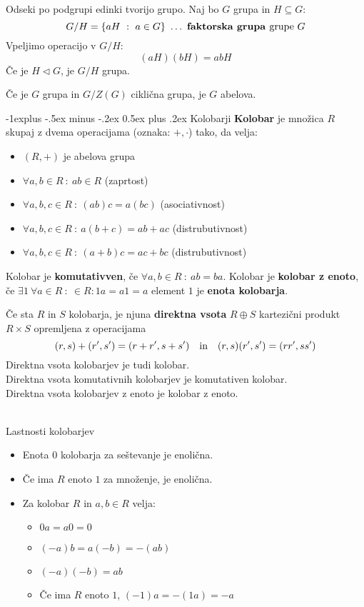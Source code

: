 \documentclass[a4paper,8pt]{extarticle}
\makeatletter
\renewcommand{\subsection}{\@startsection{subsection}{2}{0mm}%
                                {-1explus -.5ex minus -.2ex}%
                                {0.5ex plus .2ex}%
                                {\normalfont\normalsize\bfseries}}
\makeatother
\begin{document}
\begin{multicols}{4}
Odseki po podgrupi edinki tvorijo grupo. Naj bo $G$ grupa in $H\subseteq G$:
\[G/H = \left\{ aH\ :\ a \in G \right\}\ \dots\ \textbf{faktorska grupa }\textmd{grupe }G\]
Vpeljimo operacijo v $G/H$:
\[(aH)(bH) = abH\]
Če je $H \lhd G$, je $G/H$ grupa.

Če je $G$ grupa in $G/Z(G)$ ciklična grupa, je $G$ abelova.

\subsection{Kolobarji}
\textbf{Kolobar} je množica $R$ skupaj z dvema operacijama (oznaka: $+, \cdot$) tako, da velja:
\begin{itemize}
    \item $(R, +)$ je abelova grupa
    \item $\forall a, b \in R\ :\ ab \in R$ (zaprtost)
    \item $\forall a, b, c \in R\ :\ (ab)c = a(bc)$ (asociativnost)
    \item $\forall a, b, c \in R\ :\ a(b+c) = ab + ac$ (distrubutivnost)
    \item $\forall a, b, c \in R\ :\ (a+b)c = ac + bc$ (distrubutivnost)
\end{itemize}
Kolobar je \textbf{komutativven}, če $\forall a, b \in R\ :\ ab = ba$.
Kolobar je \textbf{kolobar z enoto}, če $\exists 1\ \forall a \in R\ :\ \in R : 1a = a1 = a$ element $1$ je \textbf{enota kolobarja}.

Če sta $R$ in $S$ kolobarja, je njuna \textbf{direktna vsota} $R \oplus S$ kartezični produkt $R \times S$ opremljena z operacijama
\[(r,s) + (r',s') = (r+r',s+s') \quad \textmd{in} \quad (r,s)(r',s') = (rr',ss')\]
Direktna vsota kolobarjev je tudi kolobar. \\
Direktna vsota komutativnih kolobarjev je komutativen kolobar.\\
Direktna vsota kolobarjev z enoto je kolobar z enoto.\\\

Lastnosti kolobarjev
\begin{itemize}
    \item Enota $0$ kolobarja za seštevanje je enolična.
    \item Če ima $R$ enoto $1$ za množenje, je enolična.
    \item Za kolobar $R$ in $a, b \in R$ velja:
    \begin{itemize}
        \item $0a = a0 = 0$
        \item $(-a)b = a(-b) = -(ab)$
        \item $(-a)(-b) = ab$
        \item Če ima $R$ enoto $1$, $(-1)a = -(1a) = -a$
    \end{itemize}
\end{itemize}


\end{multicols}
\end{document}
